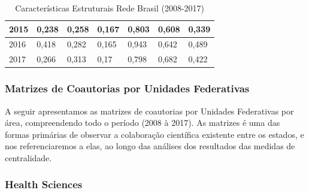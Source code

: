 \begin{table}[H]
\begin{tabular}{|l|l|l|l|l|l|l|}
		2015 & 0,238                                                      & 0,258                                                            & 0,167                                                               & 0,803                                                      & 0,608                                                            & 0,339                                                               \\ \hline
		2016 & 0,418                                                      & 0,282                                                            & 0,165                                                               & 0,943                                                      & 0,642                                                            & 0,489                                                               \\ \hline
		2017 & 0,266                                                      & 0,313                                                            & 0,17                                                                & 0,798                                                      & 0,682                                                            & 0,422                                                               \\ \hline
	\end{tabular}
\caption{Características Estruturais Rede Brasil (2008-2017)}
\label{estruturais}
\end{table}


\subsubsection{\textbf{Matrizes de Coautorias por Unidades Federativas}}

A seguir apresentamos as matrizes de coautorias por Unidades Federativas por área, compreendendo todo o período (2008 à 2017). As matrizes é uma das formas primárias de observar a colaboração científica existente entre os estados, e nos referenciaremos a elas, ao longo das análises dos resultados das medidas de centralidade.

\subsubsection{Health Sciences}

